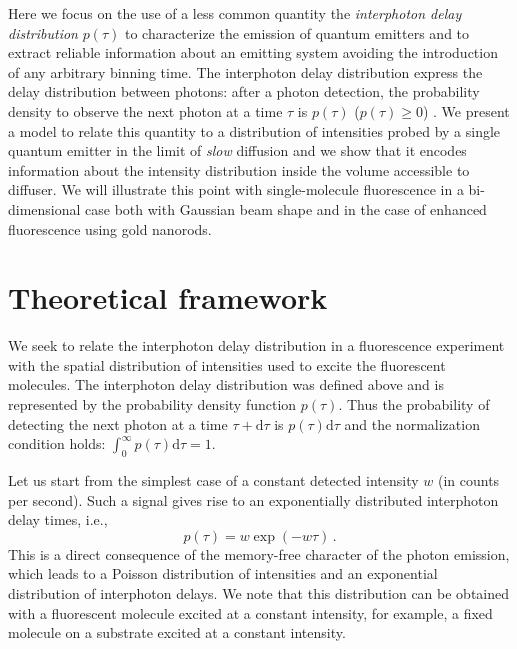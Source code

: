 Here we focus on the use of a less common quantity the 
\textit{interphoton delay distribution} $p(\tau)$
to characterize the emission of quantum emitters and to extract reliable 
information about an emitting system avoiding the introduction of any arbitrary 
binning time. The interphoton delay distribution express the delay distribution 
between photons: after a photon detection, the probability density to observe 
the next photon at a time $\tau$ is $p(\tau)$ ($p(\tau)\geq 0$) \cite{Verberk2003}.
We present a model to relate this quantity to a distribution of intensities probed by a 
single quantum emitter in the limit of \textit{slow} diffusion and we show that it 
encodes information about the intensity distribution inside the volume accessible 
to diffuser. We will illustrate this point with single-molecule fluorescence 
in a bi-dimensional case both with Gaussian beam shape and in the case of 
enhanced fluorescence using gold nanorods.

\section{Theoretical framework}

We seek to relate the interphoton delay distribution in a fluorescence experiment with 
the spatial distribution of intensities used to excite the fluorescent molecules. The interphoton
delay distribution was defined above and is represented by the probability density function $p(\tau)$. 
Thus the probability of detecting the next photon at a time 
$\tau+\mbox{d}\tau$ is $p(\tau)\mbox{d}\tau$ and the
normalization condition holds: $\int_0^{\infty}{p(\tau)\mbox{d}\tau}=1$.

Let us start from the simplest case of a constant detected intensity $w$ 
(in counts per second). Such a signal gives rise to an exponentially distributed 
interphoton delay times, i.e., 
\begin{equation}
p(\tau)=w\exp(-w\tau)\,.
\label{eq:exponential_distribution}
\end{equation}
This is a direct consequence of the memory-free character of the photon 
emission, which leads to a Poisson distribution of intensities and an 
exponential distribution of interphoton delays. We note that this distribution 
can be obtained with a fluorescent molecule excited at a constant intensity, 
for example, a fixed molecule on a substrate excited at a constant intensity. 

